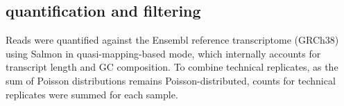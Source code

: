 \subsection{ quantification and filtering}

Reads were quantified against the Ensembl reference transcriptome (GRCh38) using Salmon\autocite{patro2017SalmonProvidesFast} in quasi-mapping-based mode, which internally accounts for transcript length and GC composition.
To combine technical replicates, as the sum of Poisson distributions remains Poisson-distributed, counts for technical replicates were summed for each sample.
